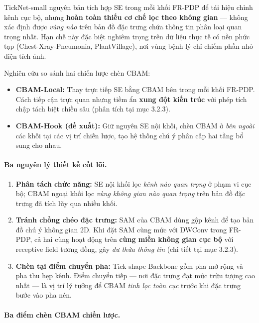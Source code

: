 \documentclass[
]{article}
\begin{document}
TickNet-small nguyên bản tích hợp SE trong mỗi khối FR-PDP để tái hiệu chỉnh kênh cục bộ, nhưng \textbf{hoàn toàn thiếu cơ chế lọc theo không gian} --- không xác định được \textit{vùng nào} trên bản đồ đặc trưng chứa thông tin phân loại quan trọng nhất. Hạn chế này đặc biệt nghiêm trọng trên dữ liệu thực tế có nền phức tạp (Chest-Xray-Pneumonia, PlantVillage), nơi vùng bệnh lý chỉ chiếm phần nhỏ diện tích ảnh.

Nghiên cứu so sánh hai chiến lược chèn CBAM:

\begin{itemize}
\item \textbf{CBAM-Local:} Thay trực tiếp SE bằng CBAM bên trong mỗi khối FR-PDP. Cách tiếp cận trực quan nhưng tiềm ẩn \textbf{xung đột kiến trúc} với phép tích chập tách biệt chiều sâu (phân tích tại mục 3.2.3).

\item \textbf{CBAM-Hook (đề xuất):} Giữ nguyên SE nội khối, chèn CBAM ở \textit{bên ngoài} các khối tại các vị trí chiến lược, tạo hệ thống chú ý phân cấp hai tầng bổ sung cho nhau.
\end{itemize}

\paragraph{Ba nguyên lý thiết kế cốt lõi.}

\begin{enumerate}
\item \textbf{Phân tách chức năng:} SE nội khối lọc \textit{kênh nào quan trọng} ở phạm vi cục bộ; CBAM ngoại khối lọc \textit{vùng không gian nào quan trọng} trên bản đồ đặc trưng đã tích lũy qua nhiều khối.

\item \textbf{Tránh chồng chéo đặc trưng:} SAM của CBAM dùng gộp kênh để tạo bản đồ chú ý không gian 2D. Khi đặt SAM cùng mức với DWConv trong FR-PDP, cả hai cùng hoạt động trên \textbf{cùng miền không gian cục bộ} với receptive field tương đồng, gây \textit{dư thừa thông tin} (chi tiết tại mục 3.2.3).

\item \textbf{Chèn tại điểm chuyển pha:} Tick-shape Backbone gồm pha mở rộng và pha thu hẹp kênh. Điểm chuyển tiếp --- nơi đặc trưng đạt mức trừu tượng cao nhất --- là vị trí lý tưởng để CBAM \textit{tinh lọc toàn cục} trước khi đặc trưng bước vào pha nén.
\end{enumerate}

\paragraph{Ba điểm chèn CBAM chiến lược.}
\end{document}
